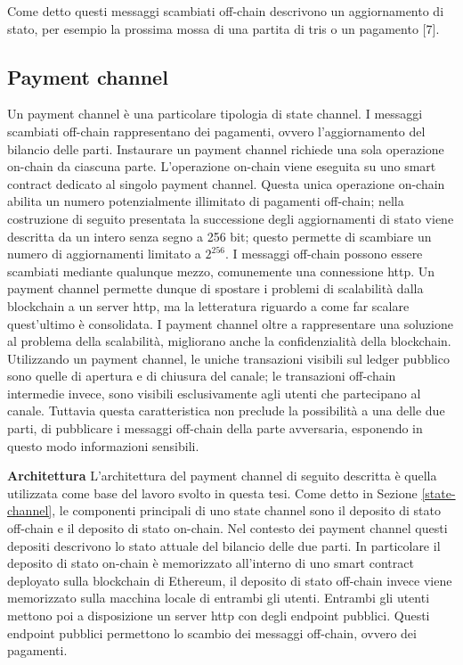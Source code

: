 \documentclass[12pt,italian,]{book}
\begin{document}
Come detto questi messaggi scambiati off-chain descrivono un aggiornamento di stato, per esempio la prossima mossa di una partita di tris o un pagamento {[}7{]}.

\hypertarget{payment-channel}{%
\subsection{Payment channel}\label{payment-channel}}

Un payment channel è una particolare tipologia di state channel. I messaggi scambiati off-chain rappresentano dei pagamenti, ovvero l'aggiornamento del bilancio delle parti. Instaurare un payment channel richiede una sola operazione on-chain da ciascuna parte. L'operazione on-chain viene eseguita su uno smart contract dedicato al singolo payment channel. Questa unica operazione on-chain abilita un numero potenzialmente illimitato di pagamenti off-chain; nella costruzione di seguito presentata la successione degli aggiornamenti di stato viene descritta da un intero senza segno a 256 bit; questo permette di scambiare un numero di aggiornamenti limitato a \(2^{256}\). I messaggi off-chain possono essere scambiati mediante qualunque mezzo, comunemente una connessione http. Un payment channel permette dunque di spostare i problemi di scalabilità dalla blockchain a un server http, ma la letteratura riguardo a come far scalare quest'ultimo è consolidata. I payment channel oltre a rappresentare una soluzione al problema della scalabilità, migliorano anche la confidenzialità della blockchain. Utilizzando un payment channel, le uniche transazioni visibili sul ledger pubblico sono quelle di apertura e di chiusura del canale; le transazioni off-chain intermedie invece, sono visibili esclusivamente agli utenti che partecipano al canale. Tuttavia questa caratteristica non preclude la possibilità a una delle due parti, di pubblicare i messaggi off-chain della parte avversaria, esponendo in questo modo informazioni sensibili.

\textbf{\textbf{Architettura}} L'architettura del payment channel di seguito descritta è quella utilizzata come base del lavoro svolto in questa tesi. Come detto in Sezione \ref{state-channel}, le componenti principali di uno state channel sono il deposito di stato off-chain e il deposito di stato on-chain. Nel contesto dei payment channel questi depositi descrivono lo stato attuale del bilancio delle due parti. In particolare il deposito di stato on-chain è memorizzato all'interno di uno smart contract deployato sulla blockchain di Ethereum, il deposito di stato off-chain invece viene memorizzato sulla macchina locale di entrambi gli utenti. Entrambi gli utenti mettono poi a disposizione un server http con degli endpoint pubblici. Questi endpoint pubblici permettono lo scambio dei messaggi off-chain, ovvero dei pagamenti.
\end{document}

